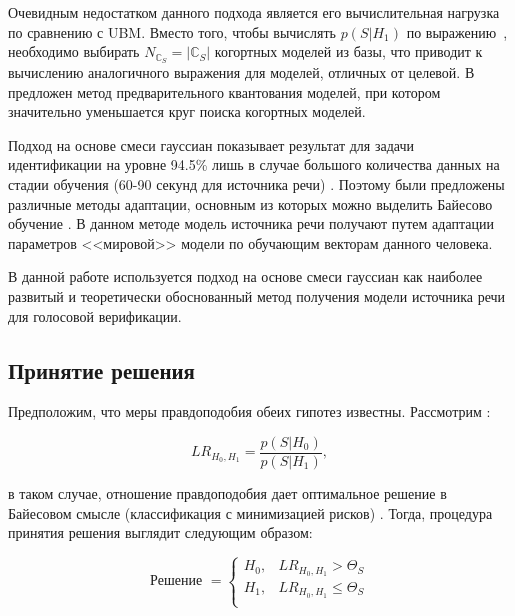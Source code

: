 Очевидным недостатком данного подхода является его вычислительная нагрузка по сравнению с UBM. Вместо того, чтобы вычислять $p(S|H_1)$ по выражению~, необходимо выбирать $N_{\mathbb{C}_S} = |\mathbb{C}_S|$ когортных моделей из базы, что приводит к вычислению аналогичного выражения для  моделей, отличных от целевой. В \cite{Kinnunen04cohort} предложен метод предварительного квантования моделей, при котором значительно уменьшается круг поиска когортных моделей.

Подход на основе смеси гауссиан показывает результат для задачи идентификации на уровне 94.5\% лишь в случае большого количества данных на стадии обучения (60-90 секунд для источника речи) \cite{Reynolds95gmm}. Поэтому были предложены различные методы адаптации, основным из которых можно выделить Байесово обучение \cite{Reynolds00speakerverification}. В данном методе модель источника речи получают путем адаптации параметров <<мировой>> модели по обучающим векторам данного человека.

В данной работе используется подход на основе смеси гауссиан как наиболее развитый и теоретически обоснованный метод получения модели источника речи для голосовой верификации.

\subsection{Принятие решения}
\label{sec:analytic:decision}

Предположим, что меры правдоподобия обеих гипотез  известны. Рассмотрим :

\begin{equation}
\label{eq:lr}
LR_{H_0, H_1} = \frac{p(S|H_0)}{p(S|H_1)},
\end{equation}

\noindent в таком случае, отношение правдоподобия дает оптимальное решение в Байесовом смысле (классификация с минимизацией рисков) \cite{Fukunaga90Intro}. Тогда, процедура принятия решения выглядит следующим образом:

\begin{equation}
\label{eq:decision}
\textrm{Решение } = \left\{ 
    \begin{array}{ll}
        H_0, & LR_{H_0, H_1} > \Theta_{S} \\
        H_1, & LR_{H_0, H_1} \leq \Theta_{S} \\
    \end{array}
\right.
\end{equation}

